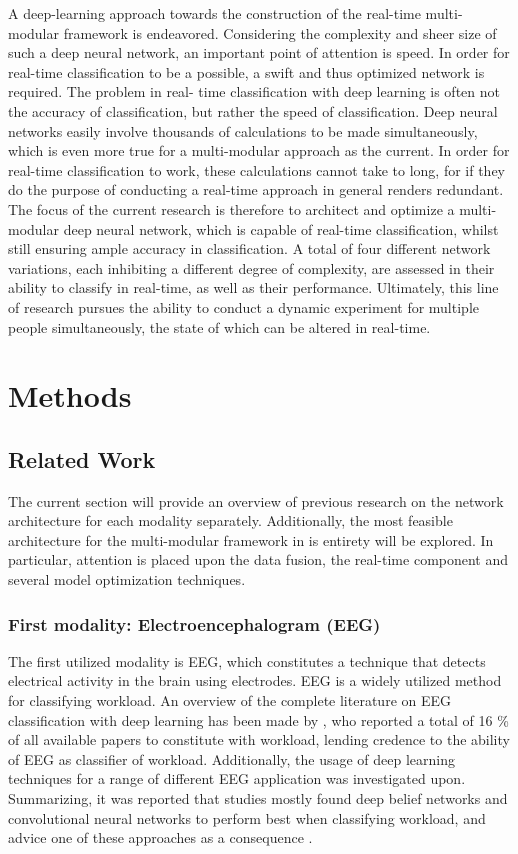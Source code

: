 \documentclass[12pt]{article}
\begin{document}
A deep-learning approach towards the construction of the real-time multi-modular framework is endeavored. Considering the complexity and sheer size of such a deep neural network, an important point of attention is speed. In order for real-time classification to be a possible, a swift and thus optimized network is required. The problem in real-	time classification with deep learning is often not the accuracy of classification, but rather the speed of classification. Deep neural networks easily involve thousands of calculations to be made simultaneously, which is even more true for a multi-modular approach as the current. In order for real-time classification to work, these calculations cannot take to long, for if they do the purpose of conducting a real-time approach in general renders redundant. The focus of the current research is therefore to architect and optimize a multi-modular deep neural network, which is capable of real-time classification, whilst still ensuring ample accuracy in classification. A total of four different network variations, each inhibiting a different degree of complexity, are assessed in their ability to classify in real-time, as well as their performance. Ultimately, this line of research pursues the ability to conduct a dynamic experiment for multiple people simultaneously, the state of which can be altered in real-time. 

\section{Methods}

\subsection{Related Work} \label{Relatedwork}
The current section will provide an overview of previous research on the network architecture for each modality separately. Additionally,  the most feasible architecture for the multi-modular framework in is entirety will be explored. In particular, attention is placed upon the data fusion, the real-time component and several model optimization techniques.

\subsubsection{First modality: Electroencephalogram (EEG)}
The first utilized modality is EEG, which constitutes a technique that detects electrical activity in the brain using electrodes. EEG is a widely utilized method for classifying workload. An overview of the complete literature on EEG classification with deep learning has been made by , who reported a total of 16 \% of all available papers to constitute with workload, lending credence to the ability of EEG as classifier of workload. Additionally, the usage of deep learning techniques for a range of different EEG application was investigated upon. Summarizing, it was reported that studies mostly found deep belief networks and convolutional neural networks to perform best when classifying workload, and advice one of these approaches as a consequence \cite{craik2019deep}.
\end{document}
